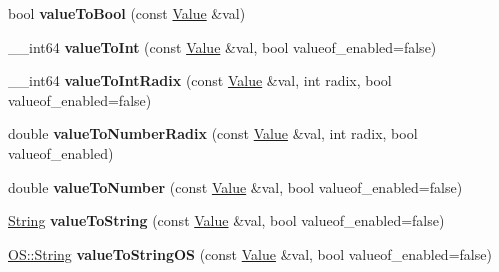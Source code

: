 \begin{DoxyCompactItemize}
\item 
bool {\bfseries value\+To\+Bool} (const \hyperlink{struct_object_script_1_1_o_s_1_1_core_1_1_value}{Value} \&val)\hypertarget{class_object_script_1_1_o_s_1_1_core_a21a61ace39ea2922b3bfdbc8bca6b588}{}\label{class_object_script_1_1_o_s_1_1_core_a21a61ace39ea2922b3bfdbc8bca6b588}

\item 
\+\_\+\+\_\+int64 {\bfseries value\+To\+Int} (const \hyperlink{struct_object_script_1_1_o_s_1_1_core_1_1_value}{Value} \&val, bool valueof\+\_\+enabled=false)\hypertarget{class_object_script_1_1_o_s_1_1_core_acd16366a63783d40f52f760478b5cacb}{}\label{class_object_script_1_1_o_s_1_1_core_acd16366a63783d40f52f760478b5cacb}

\item 
\+\_\+\+\_\+int64 {\bfseries value\+To\+Int\+Radix} (const \hyperlink{struct_object_script_1_1_o_s_1_1_core_1_1_value}{Value} \&val, int radix, bool valueof\+\_\+enabled=false)\hypertarget{class_object_script_1_1_o_s_1_1_core_acf369076859d65215d9712e189720bea}{}\label{class_object_script_1_1_o_s_1_1_core_acf369076859d65215d9712e189720bea}

\item 
double {\bfseries value\+To\+Number\+Radix} (const \hyperlink{struct_object_script_1_1_o_s_1_1_core_1_1_value}{Value} \&val, int radix, bool valueof\+\_\+enabled)\hypertarget{class_object_script_1_1_o_s_1_1_core_ae22c3096fe5012201d0b301b41093b21}{}\label{class_object_script_1_1_o_s_1_1_core_ae22c3096fe5012201d0b301b41093b21}

\item 
double {\bfseries value\+To\+Number} (const \hyperlink{struct_object_script_1_1_o_s_1_1_core_1_1_value}{Value} \&val, bool valueof\+\_\+enabled=false)\hypertarget{class_object_script_1_1_o_s_1_1_core_ab49ae573026cc65694e8b12e5e5180e5}{}\label{class_object_script_1_1_o_s_1_1_core_ab49ae573026cc65694e8b12e5e5180e5}

\item 
\hyperlink{class_object_script_1_1_o_s_1_1_core_1_1_string}{String} {\bfseries value\+To\+String} (const \hyperlink{struct_object_script_1_1_o_s_1_1_core_1_1_value}{Value} \&val, bool valueof\+\_\+enabled=false)\hypertarget{class_object_script_1_1_o_s_1_1_core_a436a906ab49739c8d61ada5694e9c276}{}\label{class_object_script_1_1_o_s_1_1_core_a436a906ab49739c8d61ada5694e9c276}

\item 
\hyperlink{class_object_script_1_1_o_s_1_1_string}{O\+S\+::\+String} {\bfseries value\+To\+String\+OS} (const \hyperlink{struct_object_script_1_1_o_s_1_1_core_1_1_value}{Value} \&val, bool valueof\+\_\+enabled=false)\hypertarget{class_object_script_1_1_o_s_1_1_core_a99518d4314a65a2bb4d537c2cd856938}{}\label{class_object_script_1_1_o_s_1_1_core_a99518d4314a65a2bb4d537c2cd856938}


\end{DoxyCompactItemize}
